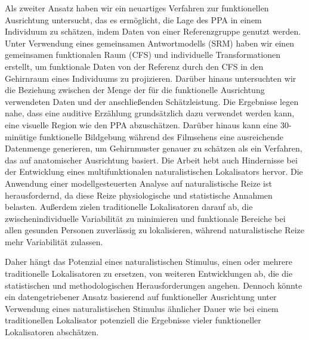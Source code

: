 Als zweiter Ansatz haben wir ein neuartiges Verfahren zur funktionellen
Ausrichtung untersucht, das es ermöglicht, die Lage des PPA in einem Individuum
zu schätzen, indem Daten von einer Referenzgruppe genutzt werden. Unter
Verwendung eines gemeinsamen Antwortmodells (SRM) haben wir einen gemeinsamen
funktionalen Raum (CFS) und individuelle Transformationen erstellt, um
funktionale Daten von der Referenz durch den CFS in den Gehirnraum eines
Individuums zu projizieren. Darüber hinaus untersuchten wir die Beziehung
zwischen der Menge der für die funktionelle Ausrichtung verwendeten Daten und
der anschließenden Schätzleistung.
Die Ergebnisse legen nahe, dass eine auditive Erzählung grundsätzlich dazu
verwendet werden kann, eine visuelle Region wie den PPA abzuschätzen. Darüber
hinaus kann eine 30-minütige funktionelle Bildgebung während des Filmsehens
eine ausreichende Datenmenge generieren, um Gehirnmuster genauer zu schätzen
als ein Verfahren, das auf anatomischer Ausrichtung basiert.
Die Arbeit hebt auch Hindernisse bei der Entwicklung eines multifunktionalen
naturalistischen Lokalisators hervor. Die Anwendung einer modellgesteuerten
Analyse auf naturalistische Reize ist herausfordernd, da diese Reize
physiologische und statistische Annahmen belasten. Außerdem zielen
traditionelle Lokalisatoren darauf ab, die zwischenindividuelle Variabilität zu
minimieren und funktionale Bereiche bei allen gesunden Personen zuverlässig zu
lokalisieren, während naturalistische Reize mehr Variabilität zulassen.

Daher hängt das Potenzial eines naturalistischen Stimulus, einen oder mehrere
traditionelle Lokalisatoren zu ersetzen, von weiteren Entwicklungen ab, die die
statistischen und methodologischen Herausforderungen angehen. Dennoch könnte
ein datengetriebener Ansatz basierend auf funktioneller Ausrichtung unter
Verwendung eines naturalistischen Stimulus ähnlicher Dauer wie bei einem
traditionellen Lokalisator potenziell die Ergebnisse vieler funktioneller
Lokalisatoren abschätzen.
